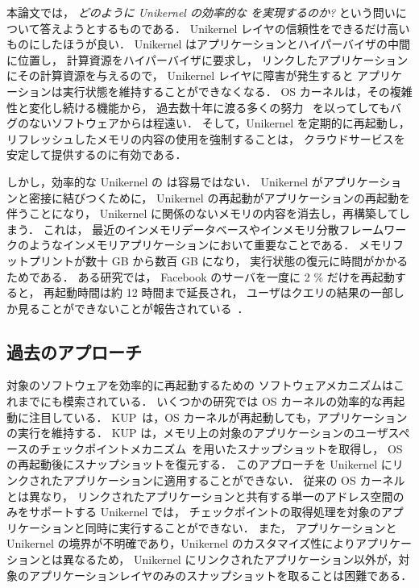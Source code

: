 本論文では，
\emph{どのように Unikernel の効率的な \rr を実現するのか?}
という問いについて答えようとするものである．
Unikernel レイヤの信頼性をできるだけ高いものにしたほうが良い．
Unikernel はアプリケーションとハイパーバイザの中間に位置し，
計算資源をハイパーバイザに要求し，
リンクしたアプリケーションにその計算資源を与えるので，
Unikernel レイヤに障害が発生すると
アプリケーションは実行状態を維持することができなくなる．
OS カーネルは，その複雑性と変化し続ける機能から，
過去数十年に渡る多くの努力~\cite{ChouEtAl-SOSP01,PalixEtAl-ASPLOS11,Syzkaller,PanEtAl-SEC17,PailoorEtAl-SEC18,SchumiloEtAl-kAFL, TalebiEtAl-SEC21}
を以ってしてもバグのないソフトウェアからは程遠い．
そして，Unikernel を定期的に再起動し，
リフレッシュしたメモリの内容の使用を強制することは，
クラウドサービスを安定して提供するのに有効である．

しかし，効率的な Unikernel の \rr は容易ではない．
Unikernel がアプリケーションと密接に結びつくために，
Unikernel の再起動がアプリケーションの再起動を伴うことになり，
Unikernel に関係のないメモリの内容を消去し，再構築してしまう．
これは，
最近のインメモリデータベースやインメモリ分散フレームワークのようなインメモリアプリケーションにおいて重要なことである．
メモリフットプリントが数十 GB から数百 GB になり，
実行状態の復元に時間がかかるためである．
ある研究では，
Facebook のサーバを一度に 2 \% だけを再起動すると，
再起動時間は約 12 時間まで延長され，
ユーザはクエリの結果の一部しか見ることができないことが報告されている~\cite{GoelEtAl-SIGMOD14}．

\subsection{過去のアプローチ}

対象のソフトウェアを効率的に再起動するための
ソフトウェアメカニズムはこれまでにも模索されている．
いくつかの研究では OS カーネルの効率的な再起動に注目している．
KUP~\cite{KashyapEtAl-KUP}は，OS カーネルが再起動しても，アプリケーションの実行を維持する．
KUP は，メモリ上の対象のアプリケーションのユーザスペースのチェックポイントメカニズム~\cite{CRIU}を用いたスナップショットを取得し，
OS の再起動後にスナップショットを復元する．
このアプローチを Unikernel にリンクされたアプリケーションに適用することができない．
従来の OS カーネルとは異なり，
リンクされたアプリケーションと共有する単一のアドレス空間のみをサポートする Unikernel では，
チェックポイントの取得処理を対象のアプリケーションと同時に実行することができない．
また，
アプリケーションと Unikernel の境界が不明確であり，Unikernel のカスタマイズ性によりアプリケーションとは異なるため，
Unikernel にリンクされたアプリケーション以外が，対象のアプリケーションレイヤのみのスナップショットを取ることは困難である．


